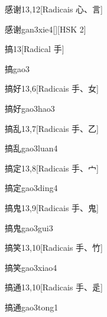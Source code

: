 \begin{entry}{感谢}{13,12}[Radicais ⼼、⾔]
  \begin{phonetics}{感谢}{gan3xie4}[][HSK 2]
  \end{phonetics}
\end{entry}

\begin{entry}{搞}{13}[Radical ⼿]
  \begin{phonetics}{搞}{gao3}
  \end{phonetics}
\end{entry}

\begin{entry}{搞好}{13,6}[Radicais ⼿、⼥]
  \begin{phonetics}{搞好}{gao3hao3}
  \end{phonetics}
\end{entry}

\begin{entry}{搞乱}{13,7}[Radicais ⼿、⼄]
  \begin{phonetics}{搞乱}{gao3luan4}
  \end{phonetics}
\end{entry}

\begin{entry}{搞定}{13,8}[Radicais ⼿、⼧]
  \begin{phonetics}{搞定}{gao3ding4}
  \end{phonetics}
\end{entry}

\begin{entry}{搞鬼}{13,9}[Radicais ⼿、⿁]
  \begin{phonetics}{搞鬼}{gao3gui3}
  \end{phonetics}
\end{entry}

\begin{entry}{搞笑}{13,10}[Radicais ⼿、⽵]
  \begin{phonetics}{搞笑}{gao3xiao4}
  \end{phonetics}
\end{entry}

\begin{entry}{搞通}{13,10}[Radicais ⼿、⾡]
  \begin{phonetics}{搞通}{gao3tong1}
  \end{phonetics}
\end{entry}

